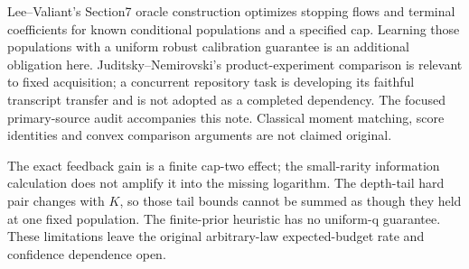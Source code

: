 \documentclass[11pt]{article}
\begin{document}
Lee--Valiant's Section7 oracle construction optimizes stopping flows and
terminal coefficients for known conditional populations and a specified
cap. Learning those populations with a uniform robust calibration guarantee
is an additional obligation here. Juditsky--Nemirovski's product-experiment
comparison is relevant to fixed acquisition; a concurrent repository task
is developing its faithful transcript transfer and is not adopted as a
completed dependency. The focused primary-source audit accompanies this
note. Classical moment matching, score identities and convex comparison
arguments are not claimed original.

The exact feedback gain is a finite cap-two effect; the small-rarity
information calculation does not amplify it into the missing logarithm.
The depth-tail hard pair changes with $K$, so those tail bounds cannot be
summed as though they held at one fixed population. The finite-prior
heuristic has no uniform-q guarantee. These limitations leave the original
arbitrary-law expected-budget rate and confidence dependence open.
\end{document}
